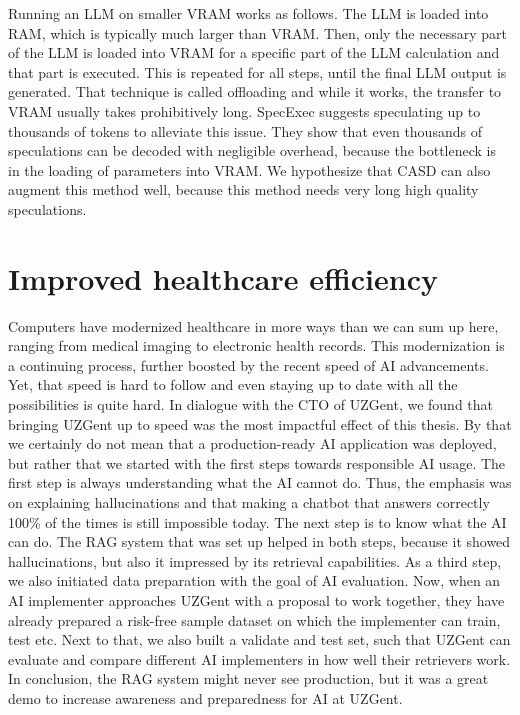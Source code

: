 Running an LLM on smaller VRAM works as follows. The LLM is loaded into RAM, which is typically much larger than VRAM. Then, only the necessary part of the LLM is loaded into VRAM for a specific part of the LLM calculation and that part is executed. This is repeated for all steps, until the final LLM output is generated. That technique is called offloading and while it works, the transfer to VRAM usually takes prohibitively long. SpecExec \cite{svirschevski2024specexec} suggests speculating up to thousands of tokens to alleviate this issue. They show that even thousands of speculations can be decoded with negligible overhead, because the bottleneck is in the loading of parameters into VRAM. We hypothesize that CASD can also augment this method well, because this method needs very long high quality speculations.

\section{Improved healthcare efficiency}
Computers have modernized healthcare in more ways than we can sum up here, ranging from medical imaging to electronic health records. This modernization is a continuing process, further boosted by the recent speed of AI advancements. Yet, that speed is hard to follow and even staying up to date with all the possibilities is quite hard. In dialogue with the CTO of UZGent, we found that bringing UZGent up to speed was the most impactful effect of this thesis. By that we certainly do not mean that a production-ready AI application was deployed, but rather that we started with the first steps towards responsible AI usage. The first step is always understanding what the AI cannot do. Thus, the emphasis was on explaining hallucinations and that making a chatbot that answers correctly 100\% of the times is still impossible today. The next step is to know what the AI can do. The RAG system that was set up helped in both steps, because it showed hallucinations, but also it impressed by its retrieval capabilities. As a third step, we also initiated data preparation with the goal of AI evaluation. Now, when an AI implementer approaches UZGent with a proposal to work together, they have already prepared a risk-free sample dataset on which the implementer can train, test etc. Next to that, we also built a validate and test set, such that UZGent can evaluate and compare different AI implementers in how well their retrievers work. In conclusion, the RAG system might never see production, but it was a great demo to increase awareness and preparedness for AI at UZGent.

